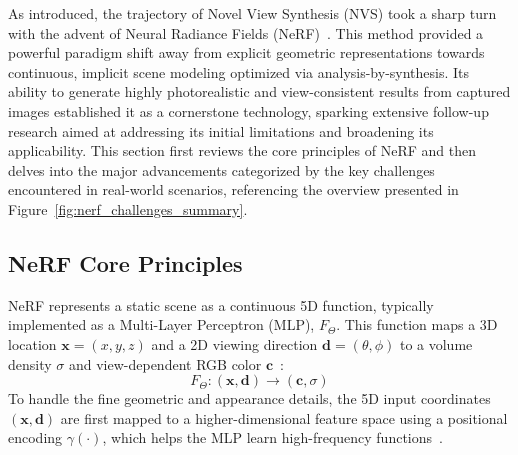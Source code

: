 As introduced, the trajectory of Novel View Synthesis (NVS) took a sharp turn with the advent of Neural Radiance Fields (NeRF)~\cite{mildenhall2020nerf}. This method provided a powerful paradigm shift away from explicit geometric representations towards continuous, implicit scene modeling optimized via analysis-by-synthesis. Its ability to generate highly photorealistic and view-consistent results from captured images established it as a cornerstone technology, sparking extensive follow-up research aimed at addressing its initial limitations and broadening its applicability. This section first reviews the core principles of NeRF and then delves into the major advancements categorized by the key challenges encountered in real-world scenarios, referencing the overview presented in Figure~\ref{fig:nerf_challenges_summary}. %

\subsection{NeRF Core Principles}
\label{subsec:nerf_principles_revised}

NeRF represents a static scene as a continuous 5D function, typically implemented as a Multi-Layer Perceptron (MLP), $F_{\Theta}$. This function maps a 3D location $\mathbf{x}=(x,y,z)$ and a 2D viewing direction $\mathbf{d}=(\theta, \phi)$ to a volume density $\sigma$ and view-dependent RGB color $\mathbf{c}$~\cite{mildenhall2020nerf}:
\begin{equation}
    F_{\Theta}: (\mathbf{x}, \mathbf{d}) \rightarrow (\mathbf{c}, \sigma)
    \label{eq:nerf_func}
\end{equation}
To handle the fine geometric and appearance details, the 5D input coordinates $(\mathbf{x}, \mathbf{d})$ are first mapped to a higher-dimensional feature space using a positional encoding $\gamma(\cdot)$, which helps the MLP learn high-frequency functions~\cite{mildenhall2020nerf}.

